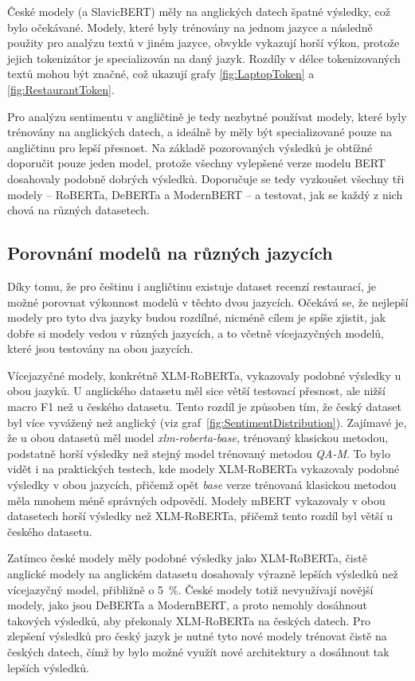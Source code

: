 České modely (a SlavicBERT) měly na anglických datech špatné výsledky, což bylo očekávané. Modely, které byly trénovány na jednom jazyce a následně použity pro analýzu textů v jiném jazyce, obvykle vykazují horší výkon, protože jejich tokenizátor je specializován na daný jazyk. Rozdíly v délce tokenizovaných textů mohou být značné, což ukazují grafy \ref{fig:LaptopToken} a \ref{fig:RestaurantToken}.

Pro analýzu sentimentu v angličtině je tedy nezbytné používat modely, které byly trénovány na anglických datech, a ideálně by měly být specializované pouze na angličtinu pro lepší přesnost. Na základě pozorovaných výsledků je obtížné doporučit pouze jeden model, protože všechny vylepšené verze modelu BERT dosahovaly podobně dobrých výsledků. Doporučuje se tedy vyzkoušet všechny tři modely -- RoBERTa, DeBERTa a ModernBERT -- a testovat, jak se každý z nich chová na různých datasetech.

\subsection{Porovnání modelů na různých jazycích}  
Díky tomu, že pro češtinu i angličtinu existuje dataset recenzí restaurací, je možné porovnat výkonnost modelů v těchto dvou jazycích. Očekává se, že nejlepší modely pro tyto dva jazyky budou rozdílné, nicméně cílem je spíše zjistit, jak dobře si modely vedou v různých jazycích, a to včetně vícejazyčných modelů, které jsou testovány na obou jazycích.

Vícejazyčné modely, konkrétně XLM-RoBERTa, vykazovaly podobné výsledky u obou jazyků. U anglického datasetu měl sice větší testovací přesnost, ale nižší macro F1 než u českého datasetu. Tento rozdíl je způsoben tím, že český dataset byl více vyvážený než anglický (viz graf~\ref{fig:SentimentDistribution}). Zajímavé je, že u obou datasetů měl model \emph{xlm-roberta-base}, trénovaný klasickou metodou, podstatně horší výsledky než stejný model trénovaný metodou \emph{QA-M}. To bylo vidět i na praktických testech, kde modely XLM-RoBERTa vykazovaly podobné výsledky v obou jazycích, přičemž opět \emph{base} verze trénovaná klasickou metodou měla mnohem méně správných odpovědí. Modely mBERT vykazovaly v obou datasetech horší výsledky než XLM-RoBERTa, přičemž tento rozdíl byl větší u českého datasetu.

Zatímco české modely měly podobné výsledky jako XLM-RoBERTa, čistě anglické modely na anglickém datasetu dosahovaly výrazně lepších výsledků než vícejazyčný model, přibližně o 5~\%. České modely totiž nevyužívají novější modely, jako jsou DeBERTa a ModernBERT, a proto nemohly dosáhnout takových výsledků, aby překonaly XLM-RoBERTa na českých datech. Pro zlepšení výsledků pro český jazyk je nutné tyto nové modely trénovat čistě na českých datech, čímž by bylo možné využít nové architektury a dosáhnout tak lepších výsledků.

